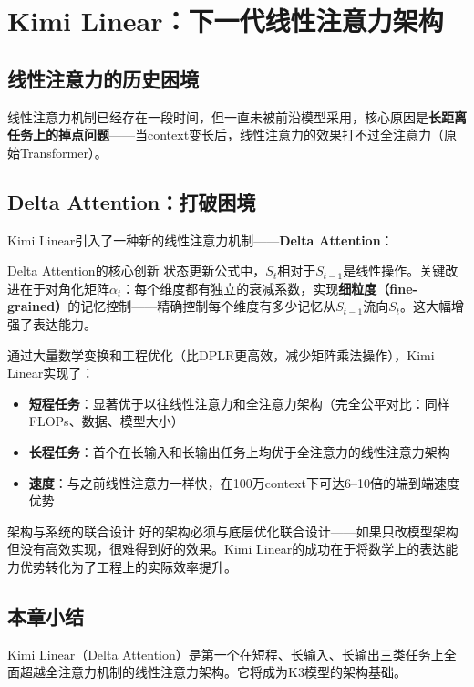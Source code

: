 \section{Kimi Linear：下一代线性注意力架构}

\subsection{线性注意力的历史困境}

线性注意力机制已经存在一段时间，但一直未被前沿模型采用，核心原因是\textbf{长距离任务上的掉点问题}——当context变长后，线性注意力的效果打不过全注意力（原始Transformer）。

\subsection{Delta Attention：打破困境}

Kimi Linear引入了一种新的线性注意力机制——\textbf{Delta Attention}：

\begin{importantbox}{Delta Attention的核心创新}
状态更新公式中，$S_t$相对于$S_{t-1}$是线性操作。关键改进在于对角化矩阵$\alpha_t$：每个维度都有独立的衰减系数，实现\textbf{细粒度（fine-grained）}的记忆控制——精确控制每个维度有多少记忆从$S_{t-1}$流向$S_t$。这大幅增强了表达能力。
\end{importantbox}

通过大量数学变换和工程优化（比DPLR更高效，减少矩阵乘法操作），Kimi Linear实现了：

\begin{itemize}
\item \textbf{短程任务}：显著优于以往线性注意力和全注意力架构（完全公平对比：同样FLOPs、数据、模型大小）
\item \textbf{长程任务}：首个在长输入和长输出任务上均优于全注意力的线性注意力架构
\item \textbf{速度}：与之前线性注意力一样快，在100万context下可达6--10倍的端到端速度优势
\end{itemize}

\begin{warningbox}{架构与系统的联合设计}
好的架构必须与底层优化联合设计——如果只改模型架构但没有高效实现，很难得到好的效果。Kimi Linear的成功在于将数学上的表达能力优势转化为了工程上的实际效率提升。
\end{warningbox}

\subsection{本章小结}

Kimi Linear（Delta Attention）是第一个在短程、长输入、长输出三类任务上全面超越全注意力机制的线性注意力架构。它将成为K3模型的架构基础。


